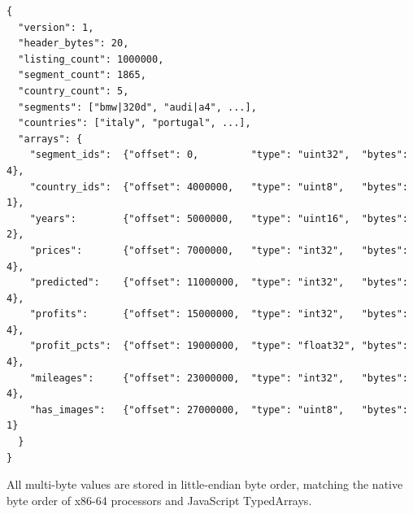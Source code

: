 \documentclass[11pt,a4paper,twoside]{book}
\begin{document}
\begin{verbatim}
{
  "version": 1,
  "header_bytes": 20,
  "listing_count": 1000000,
  "segment_count": 1865,
  "country_count": 5,
  "segments": ["bmw|320d", "audi|a4", ...],
  "countries": ["italy", "portugal", ...],
  "arrays": {
    "segment_ids":  {"offset": 0,         "type": "uint32",  "bytes": 4},
    "country_ids":  {"offset": 4000000,   "type": "uint8",   "bytes": 1},
    "years":        {"offset": 5000000,   "type": "uint16",  "bytes": 2},
    "prices":       {"offset": 7000000,   "type": "int32",   "bytes": 4},
    "predicted":    {"offset": 11000000,  "type": "int32",   "bytes": 4},
    "profits":      {"offset": 15000000,  "type": "int32",   "bytes": 4},
    "profit_pcts":  {"offset": 19000000,  "type": "float32", "bytes": 4},
    "mileages":     {"offset": 23000000,  "type": "int32",   "bytes": 4},
    "has_images":   {"offset": 27000000,  "type": "uint8",   "bytes": 1}
  }
}
\end{verbatim}

All multi-byte values are stored in little-endian byte order, matching the native byte order
of x86-64 processors and JavaScript TypedArrays.
\end{document}
